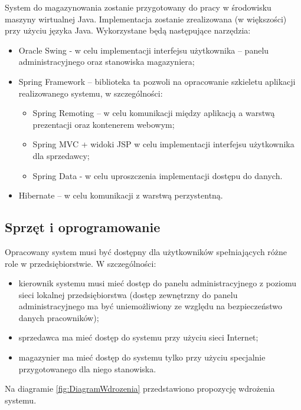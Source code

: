 System do magazynowania zostanie przygotowany do pracy w środowisku
maszyny wirtualnej Java. Implementacja zostanie zrealizowana (w
większości) przy użyciu języka Java. Wykorzystane będą następujące
narzędzia:
\begin{itemize}
\item Oracle Swing - w celu implementacji interfejsu użytkownika --
  panelu administracyjnego oraz stanowiska magazyniera;
\item Spring Framework -- biblioteka ta pozwoli na opracowanie
  szkieletu aplikacji realizowanego systemu, w szczególności:
  \begin{itemize}
  \item Spring Remoting -- w celu komunikacji między aplikacją a
    warstwą prezentacji oraz kontenerem webowym;
  \item Spring MVC + widoki JSP w celu implementacji interfejsu
    użytkownika dla sprzedawcy;
  \item Spring Data - w celu uproszczenia implementacji dostępu do
    danych.
  \end{itemize}
\item Hibernate -- w celu komunikacji z warstwą perzystentną.
\end{itemize}

\subsection{Sprzęt i oprogramowanie}

Opracowany system musi być dostępny dla użytkowników spełniających
różne role w przedsiębiorstwie.  W szczególności:
\begin{itemize}
\item kierownik systemu musi mieć dostęp do panelu administracyjnego z
  poziomu sieci lokalnej przedsiębiorstwa (dostęp zewnętrzny do panelu
  administracyjnego ma być uniemożliwiony ze względu na bezpieczeństwo
  danych pracowników);
\item sprzedawca ma mieć dostęp do systemu przy użyciu sieci Internet;
\item magazynier ma mieć dostęp do systemu tylko przy użyciu
  specjalnie przygotowanego dla niego stanowiska.
\end{itemize}

Na diagramie \ref{fig:DiagramWdrozenia} przedstawiono propozycję
wdrożenia systemu.

